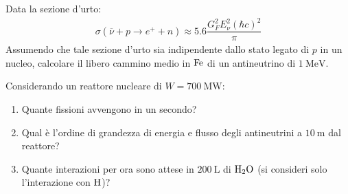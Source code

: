 \documentclass[../main.tex]{subfiles}
\begin{document}
	\begin{ese}[9.2]
		Data la sezione d'urto:
		\begin{gather}
		\label{eqn:sigmanu}
		\sigma(\overline{\nu}+p\to e^++n)\approx5.6\dfrac{G_{F}^2E_{\nu}^{2}\left(\hbar c\right)^2}{\pi}
		\end{gather}
		Assumendo che tale sezione d'urto sia indipendente dallo stato legato di $ p $ in un nucleo, calcolare il libero cammino medio in $ \mathrm{Fe} $ di un antineutrino di $ \SI{1}{\mega\electronvolt} $.
		
		Considerando un reattore nucleare di $ W=\SI{700}{\mega\watt} $:
		\begin{enumerate}
			\item Quante fissioni avvengono in un secondo?
			\item Qual è l'ordine di grandezza di energia e flusso degli antineutrini a $ \SI{10}{\meter} $ dal reattore?
			\item Quante interazioni per ora sono attese in $ \SI{200}{\liter} $ di $ \mathrm{H_2O} $ (si consideri solo l'interazione con $ \mathrm{H} $)?
		\end{enumerate}
	\end{ese}
\end{document}
